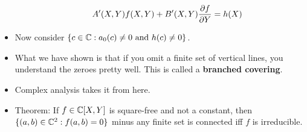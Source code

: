 \documentclass[../notes.tex]{subfiles}
\begin{document}
\begin{itemize}
\begin{itemize}
\begin{equation*}
            A'(X,Y)f(X,Y)+B'(X,Y)\pdv{f}{Y}=h(X)
        \end{equation*}
    \end{itemize}
    \item Now consider $\{c\in\mathbb{C}:a_0(c)\neq 0\text{ and }h(c)\neq 0\}$.
    \item What we have shown is that if you omit a finite set of vertical lines, you understand the zeroes pretty well. This is called a \textbf{branched covering}.
    \item Complex analysis takes it from here.
    \item Theorem: If $f\in\mathbb{C}[X,Y]$ is square-free and not a constant, then $\{(a,b)\in\mathbb{C}^2:f(a,b)=0\}$ minus any finite set is connected iff $f$ is irreducible.
\end{itemize}
\end{document}
